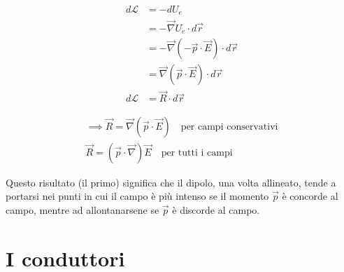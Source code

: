 \begin{align*}
	d\mathcal{L} &= -dU_e \tag*{conservatività del campo}\\
		&= - \vec{\nabla} U_e \cdot d\vec{r}  \tag*{teorema del differenziale totale}  \\
		&= - \vec{\nabla} (- \vec{p} \cdot \vec{E}) \cdot d\vec{r} \tag*{risultato ottenuto prima} \\
		&= \vec{\nabla} (\vec{p} \cdot \vec{E}) \cdot d\vec{r} \\
		d\mathcal{L} &= \vec{R} \cdot d\vec{r} \tag*{definizione di lavoro}
\end{align*}

\begin{gather*}
	\implies \boxed{\vec{R} = \vec{\nabla} (\vec{p} \cdot \vec{E})} \quad \text{per campi conservativi} \\
	\boxed{\vec{R} = (\vec{p} \cdot \vec{\nabla} )\vec{E}} \quad \text{per tutti i campi}
\end{gather*}

Questo risultato (il primo) significa che il dipolo, una volta allineato, tende a portarsi nei punti in cui il campo è più intenso se il momento $\vec{p}$ è concorde al campo, mentre ad allontanarsene se $\vec{p}$ è discorde al campo.

\section{I conduttori}

